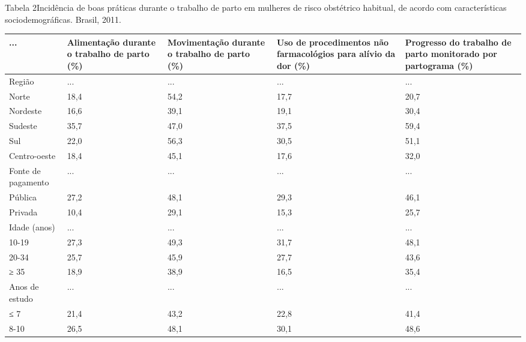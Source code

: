 \documentclass{article}
\begin{document}
Tabela 2Incidência de boas práticas durante o trabalho de parto em mulheres
de risco obstétrico habitual, de acordo com características
sociodemográficas. Brasil, 2011.
\begin{table}
\begin{xtabular}{ l | l | l | l | l }
\hline... & Alimentação durante o trabalho de parto (\%) & Movimentação durante o
trabalho de parto (\%) & Uso de procedimentos não farmacológios para alívio da
dor
(\%) & Progresso do trabalho de parto monitorado por partograma
(\%)\\ \hline
Região
& ...
& ...
& ...
& ...
\\ \hline

Norte
& 18,4
& 54,2
& 17,7
& 20,7
\\ \hline

Nordeste
& 16,6
& 39,1
& 19,1
& 30,4
\\ \hline

Sudeste
& 35,7
& 47,0
& 37,5
& 59,4
\\ \hline

Sul
& 22,0
& 56,3
& 30,5
& 51,1
\\ \hline

Centro-oeste
& 18,4
& 45,1
& 17,6
& 32,0
\\ \hline

Fonte de pagamento
& ...
& ...
& ...
& ...
\\ \hline

Pública
& 27,2
& 48,1
& 29,3
& 46,1
\\ \hline

Privada
& 10,4
& 29,1
& 15,3
& 25,7
\\ \hline

Idade (anos)
& ...
& ...
& ...
& ...
\\ \hline

10-19
& 27,3
& 49,3
& 31,7
& 48,1
\\ \hline

20-34
& 25,7
& 45,9
& 27,7
& 43,6
\\ \hline

≥ 35
& 18,9
& 38,9
& 16,5
& 35,4
\\ \hline

Anos de estudo
& ...
& ...
& ...
& ...
\\ \hline

≤ 7
& 21,4
& 43,2
& 22,8
& 41,4
\\ \hline

8-10
& 26,5
& 48,1
& 30,1
& 48,6
\\ \hline


\end{xtabular}
\end{table}
\end{document}
